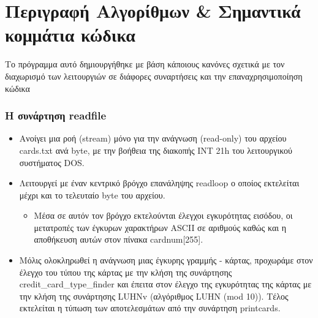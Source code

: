 \documentclass[10pt,a4paper]{article}
\begin{document}
\section*{Περιγραφή Αλγορίθμων \& Σημαντικά κομμάτια κώδικα}
Το πρόγραμμα αυτό δημιουργήθηκε με βάση κάποιους κανόνες σχετικά με τον διαχωρισμό των λειτουργιών σε διάφορες συναρτήσεις και την επαναχρησιμοποίηση κώδικα

\subsubsection*{Η συνάρτηση \latintext readfile}
\begin{itemize}
\item Ανοίγει μια ροή \latintext (stream) \greektext μόνο για την ανάγνωση \latintext (read-only) \greektext του αρχείου \latintext cards.txt \greektext ανά \latintext byte\greektext, με την βοήθεια της διακοπής \latintext INT 21h \greektext του λειτουργικού συστήματος \latintext DOS\greektext.
\item Λειτουργεί με έναν κεντρικό βρόγχο επανάληψης \latintext readloop \greektext ο οποίος εκτελείται μέχρι και το τελευταίο \latintext byte \greektext του αρχείου.
	\begin{itemize}
	\item Μέσα σε αυτόν τον βρόγχο εκτελούνται έλεγχοι εγκυρότητας εισόδου, οι μετατροπές των έγκυρων χαρακτήρων \latintext ASCII \greektext σε αριθμούς καθώς και η αποθήκευση αυτών στον πίνακα \latintext cardnum[255]\greektext.
	\end{itemize}
\item Μόλις ολοκληρωθεί η ανάγνωση μιας έγκυρης γραμμής - κάρτας, προχωράμε στον έλεγχο του τύπου της κάρτας με την κλήση της συνάρτησης \latintext credit\_card\_type\_finder \greektext και έπειτα στον έλεγχο της εγκυρότητας της κάρτας με την κλήση της συνάρτησης \latintext LUHNv \greektext (αλγόριθμος \latintext LUHN (mod 10)\greektext). Τέλος εκτελείται η τύπωση των αποτελεσμάτων από την συνάρτηση \latintext printcards\greektext.
\end{itemize}
\end{document}
